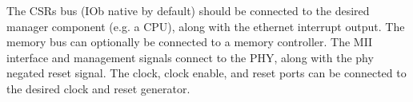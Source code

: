 %

The CSRs bus (IOb native by default) should be connected to the desired manager component (e.g. a CPU), along with the ethernet interrupt output.
The memory bus can optionally be connected to a memory controller.
The MII interface and management signals connect to the PHY, along with the phy negated reset signal.
The clock, clock enable, and reset ports can be connected to the desired clock and reset generator.

\FloatBarrier
